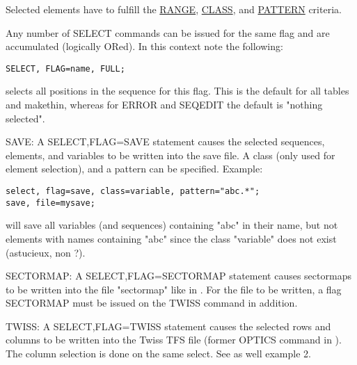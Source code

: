 Selected elements have to fulfill the \href{ranges.html#range}{RANGE},
\href{ranges.html#class}{CLASS}, and \href{wildcard.html}{PATTERN}
criteria.  

Any number of SELECT commands can be issued for the same flag and are
accumulated (logically ORed). In this context note the following:  

\begin{verbatim}
SELECT, FLAG=name, FULL;
\end{verbatim} 
selects all positions in the sequence for this flag. This is the default
for all tables and makethin, whereas for ERROR and SEQEDIT the default
is "nothing selected".  

\label{save_select}
SAVE: A SELECT,FLAG=SAVE statement causes the
selected sequences, elements, and variables to be written into the save
file. A class (only used for element selection), and a pattern can be
specified. Example:  
\begin{verbatim}
select, flag=save, class=variable, pattern="abc.*";
save, file=mysave;
\end{verbatim} 
will save all variables (and sequences) containing "abc" in their name,
but not elements with names containing "abc" since the class "variable"
does not exist (astucieux, non ?).  

SECTORMAP: A SELECT,FLAG=SECTORMAP statement causes sectormaps to be
written into the file "sectormap" like in \madeight. For the file to be
written, a flag SECTORMAP must be issued on the TWISS command in
addition.  

TWISS: A SELECT,FLAG=TWISS statement causes the selected rows and
columns to be written into the Twiss TFS file (former OPTICS command in
\madeight). The column selection is done on the same select. See as well
example 2.  



